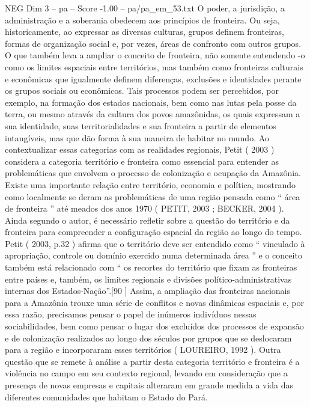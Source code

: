 \begin{textsample}{NEG Dim 3 – pa – Score -1.00 – pa/pa\_em\_53.txt}  \label{ex:f3_neg_053}
O poder, a jurisdição, a administração e a soberania obedecem aos princípios de fronteira.
Ou seja, historicamente, ao expressar as diversas culturas, grupos definem fronteiras, formas de organização social e, por vezes, áreas de confronto com outros grupos.
O que também leva a ampliar o conceito de fronteira, não somente entendendo -o como os limites espaciais entre territórios, mas também como fronteiras culturais e econômicas que igualmente definem diferenças, exclusões e identidades perante os grupos sociais ou econômicos.
Tais processos podem ser percebidos, por exemplo, na formação dos estados nacionais, bem como nas lutas pela posse da terra, ou mesmo através da cultura dos povos amazônidas, os quais expressam a sua identidade, suas territorialidades e sua fronteira a partir de elementos intangíveis, mas que dão forma à sua maneira de habitar no mundo.
Ao contextualizar essas categorias com as realidades regionais, Petit ( 2003 ) considera a categoria território e fronteira como essencial para entender as problemáticas que envolvem o processo de colonização e ocupação da Amazônia.
Existe uma importante relação entre território, economia e política, mostrando como localmente se deram as problemáticas de uma região pensada como “ área de fronteira ” até meados dos anos 1970 ( PETIT, 2003 ; BECKER, 2004 ).
Ainda segundo o autor, é necessário refletir sobre a questão do território e da fronteira para compreender a configuração espacial da região ao longo do tempo.
Petit ( 2003, p.32 ) afirma que o território deve ser entendido como “ vinculado à apropriação, controle ou domínio exercido numa determinada área ” e o conceito também está relacionado com “ os recortes do território que fixam as fronteiras entre países e, também, os limites regionais e divisões político-administrativas internas dos Estados-Nação”.[90 ] Assim, a ampliação das fronteiras nacionais para a Amazônia trouxe uma série de conflitos e novas dinâmicas espaciais e, por essa razão, precisamos pensar o papel de inúmeros indivíduos nessas sociabilidades, bem como pensar o lugar dos excluídos dos processos de expansão e de colonização realizados ao longo dos séculos por grupos que se deslocaram para a região e incorporaram esses territórios ( LOUREIRO, 1992 ).
Outra questão que se remete à análise a partir desta categoria território e fronteira é a violência no campo em seu contexto regional, levando em consideração que a presença de novas empresas e capitais alteraram em grande medida a vida das diferentes comunidades que habitam o Estado do Pará.

\end{textsample}
